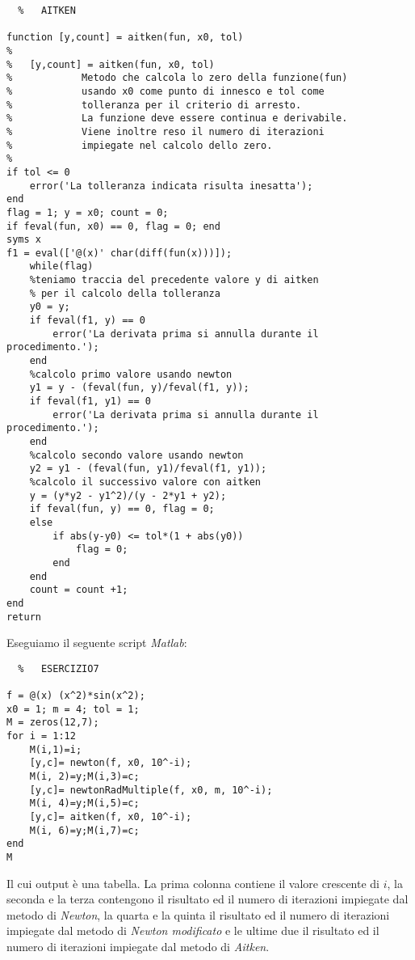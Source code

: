 \documentclass[a4paper]{report}
\begin{document}
\newpage
\begin{lstlisting}	%	AITKEN

function [y,count] = aitken(fun, x0, tol)
%
%   [y,count] = aitken(fun, x0, tol)
%            Metodo che calcola lo zero della funzione(fun)
%            usando x0 come punto di innesco e tol come 
%            tolleranza per il criterio di arresto.
%            La funzione deve essere continua e derivabile.
%            Viene inoltre reso il numero di iterazioni
%            impiegate nel calcolo dello zero.
%
if tol <= 0
	error('La tolleranza indicata risulta inesatta');
end
flag = 1; y = x0; count = 0;
if feval(fun, x0) == 0, flag = 0; end
syms x
f1 = eval(['@(x)' char(diff(fun(x)))]);
	while(flag)
	%teniamo traccia del precedente valore y di aitken
	% per il calcolo della tolleranza
	y0 = y;
	if feval(f1, y) == 0
		error('La derivata prima si annulla durante il procedimento.');
	end
	%calcolo primo valore usando newton
	y1 = y - (feval(fun, y)/feval(f1, y));
	if feval(f1, y1) == 0
		error('La derivata prima si annulla durante il procedimento.');
	end
	%calcolo secondo valore usando newton
	y2 = y1 - (feval(fun, y1)/feval(f1, y1));
	%calcolo il successivo valore con aitken
	y = (y*y2 - y1^2)/(y - 2*y1 + y2);
	if feval(fun, y) == 0, flag = 0;
	else
		if abs(y-y0) <= tol*(1 + abs(y0))
			flag = 0;
		end
	end
	count = count +1;
end
return
\end{lstlisting}
\newpage
Eseguiamo il seguente script \emph{Matlab}:\\
\begin{lstlisting}	%	ESERCIZIO7

f = @(x) (x^2)*sin(x^2);
x0 = 1; m = 4; tol = 1;
M = zeros(12,7);
for i = 1:12
	M(i,1)=i;
	[y,c]= newton(f, x0, 10^-i);
	M(i, 2)=y;M(i,3)=c; 
	[y,c]= newtonRadMultiple(f, x0, m, 10^-i);
	M(i, 4)=y;M(i,5)=c;
	[y,c]= aitken(f, x0, 10^-i);
	M(i, 6)=y;M(i,7)=c;
end
M
\end{lstlisting}
Il cui output è una tabella. La prima colonna contiene il valore crescente di $i$, la seconda e la terza contengono il risultato ed il numero di iterazioni impiegate dal metodo di \emph{Newton}, la quarta e la quinta il risultato ed il numero di iterazioni impiegate dal metodo di \emph{Newton modificato} e le ultime due il risultato ed il numero di iterazioni impiegate dal metodo di \emph{Aitken}.\\ \\
\end{document}

